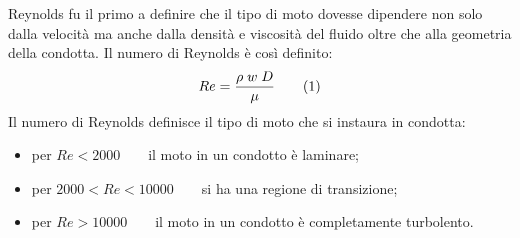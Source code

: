 Reynolds fu il primo a definire che il tipo di moto dovesse dipendere non solo dalla velocità ma anche dalla densità e viscosità del fluido oltre che alla geometria della condotta. Il numero di Reynolds è così definito:
\[Re=\frac{\rho \; w \; D}{\mu}\addtag\label{eq:reynolds}\]
Il numero di Reynolds definisce il tipo di moto che si instaura in condotta:
\begin{itemize}
    \item per \(Re<2000\qquad\)il moto in un condotto è laminare;
    \item per \(2000<Re<10000\qquad\)si ha una regione di transizione;
    \item per \(Re>10000\qquad\)il moto in un condotto è completamente turbolento.
\end{itemize}
